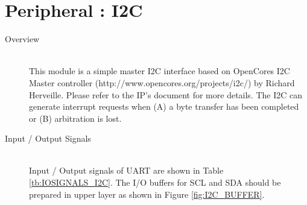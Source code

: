\section{Peripheral : I2C}

\begin{description}

    \item[Overview]\mbox{}\\
        This module is a simple master I2C interface based on OpenCores I2C Master controller (http://www.opencores.org/projects/i2c/) by Richard Herveille. Please refer to the IP’s document for more details. The I2C can generate interrupt requests when (A) a byte transfer has been completed or (B) arbitration is lost.

    \item[Input / Output Signals]\mbox{}\\
        Input / Output signals of UART are shown in Table \ref{tb:IOSIGNALS_I2C}. The I/O buffers for SCL and SDA should be prepared in upper layer as shown in Figure \ref{fig:I2C_BUFFER}.


\end{description}
